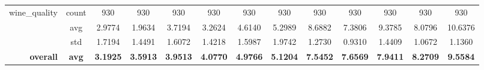 \begin{table}[htbp]
{\begin{tabular}{rcccccccccccc}
			wine\_quality                      & count                                  & 930                                                                                & 930                                                                       & 930                                                                       & 930                                                                       & 930                                           & 930                                         & 930                                            & 930                                            & 930                                            & 930                                            & 930                                            \\
			                                   & avg                                    & 2.9774                                                                             & \cellcolor[rgb]{ .776,  .937,  .808}\textcolor[rgb]{ 0,  .38,  0}{1.9634} & 3.7194                                                                    & 3.2624                                                                    & 4.6140                                        & 5.2989                                      & 8.6882                                         & 7.3806                                         & 9.3785                                         & 8.0796                                         & 10.6376                                        \\
			                                   & std                                    & 1.7194                                                                             & 1.4491                                                                    & 1.6072                                                                    & 1.4218                                                                    & 1.5987                                        & 1.9742                                      & 1.2730                                         & 0.9310                                         & 1.4409                                         & 1.0672                                         & 1.1360                                         \\
			\midrule
			\textbf{overall}                   & \textbf{avg}                           & \cellcolor[rgb]{ .776,  .937,  .808}\textcolor[rgb]{ 0,  .38,  0}{\textbf{3.1925}} & \textbf{3.5913}                                                           & \textbf{3.9513}                                                           & \textbf{4.0770}                                                           & \textbf{4.9766}                               & \textbf{5.1204}                             & \textbf{7.5452}                                & \textbf{7.6569}                                & \textbf{7.9411}                                & \textbf{8.2709}                                & \textbf{9.5584}                                \\

\end{tabular}}
\end{table}
